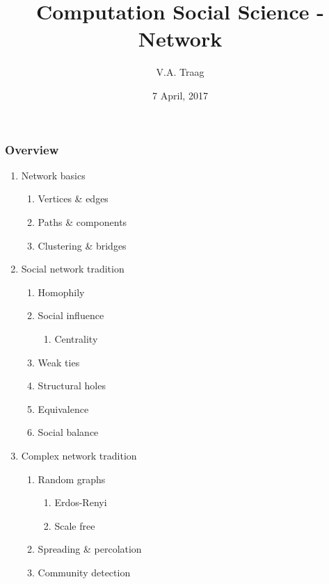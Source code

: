\documentclass[notes=hide,compress]{beamer}
\title{Computation Social Science - Network}
\author{V.A. Traag}
\institute{
  4TU, Twente, the Netherlands \\[5mm]
  4TU Seminar \\}
\date{7 April, 2017}
\begin{document}
\frame[label=title]{\titlepage}
\begin{frame}[label=overview]
  \frametitle{Overview}
  \begin{enumerate}
    \item Network basics
      \begin{enumerate}
        \item Vertices \& edges
        \item Paths \& components
        \item Clustering \& bridges
      \end{enumerate}
    \item Social network tradition
      \begin{enumerate}
        \item Homophily
        \item Social influence
        \begin{enumerate}
          \item Centrality
        \end{enumerate}
				\item Weak ties
        \item Structural holes
        \item Equivalence
        \item Social balance
      \end{enumerate}
    \item Complex network tradition
      \begin{enumerate}
        \item Random graphs
        \begin{enumerate}
          \item Erdos-Renyi
          \item Scale free
        \end{enumerate}
        \item Spreading \& percolation
        \item Community detection
      \end{enumerate}
  \end{enumerate}
\end{frame}
\end{document}
